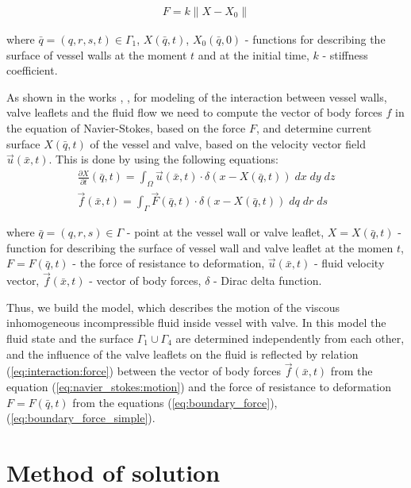 \documentclass[runningheads,a4paper]{llncs}
\begin{document}
\begin{gather}
    \label{eq:boundary_force_simple}
    F = k \|X - X_0\|
\end{gather}

where $\bar{q} = (q, r, s, t) \in \Gamma_1$, $X(\bar{q}, t)$, $X_0(\bar{q}, 0)$ - functions for describing the surface of vessel walls at the moment $t$ and at the initial time, $k$ - stiffness coefficient.

As shown in the works \cite{pescin_1977}, \cite{boyce_2011}, for modeling of the interaction between vessel walls, valve leaflets and the fluid flow we need
to compute the vector of body forces $f$ in the equation of Navier-Stokes, based on the force $F$, and determine current surface $X(\bar{q}, t)$ of the vessel and valve, based on the velocity vector field $\vec{u}(\bar{x}, t)$. This is done by using the following equations:
\begin{gather}
    \label{eq:interaction:velocity}
    \frac{\partial X}{\partial t}(\bar{q}, t) = \int_{\Omega} \vec{u}(\bar{x}, t) \cdot \delta (x - X(\bar{q}, t))\; dx\; dy\; dz\\
    \label{eq:interaction:force}
    \vec{f}(\bar{x}, t) = \int_{\Gamma} \vec{F}(\bar{q}, t) \cdot \delta (x - X(\bar{q}, t))\; dq\; dr\; ds
\end{gather}

where $\bar{q} = (q, r, s) \in \Gamma$ - point at the vessel wall or valve leaflet, $X = X(\bar{q}, t)$ - function for describing the surface
of vessel wall and valve leaflet at the momen $t$, $F = F(\bar{q}, t)$ - the force of resistance to deformation,
$\vec{u}(\bar{x}, t)$ - fluid velocity vector, $\vec{f}(\bar{x}, t)$ - vector of body forces, $\delta$ - Dirac delta function.

Thus, we build the model, which describes the motion of the viscous inhomogeneous incompressible fluid inside vessel with valve. In this model the fluid state
and the surface $\Gamma_1 \cup \Gamma_4$ are determined independently from each other, and the influence of the valve leaflets on the fluid is reflected by
relation (\ref{eq:interaction:force}) between the vector of body forces $\vec{f}(\bar{x}, t)$ from the equation (\ref{eq:navier_stokes:motion}) and the force of resistance to deformation $F = F(\bar{q}, t)$ from the equations (\ref{eq:boundary_force}), (\ref{eq:boundary_force_simple}).

\section{Method of solution}
\end{document}
